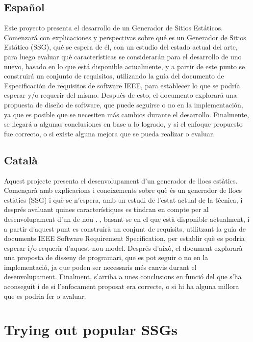 \documentclass[12pt]{report}
\begin{document}
    \section*{Español}
    Este proyecto presenta el desarrollo de un Generador de Sitios Estáticos. Comenzará con explicaciones y
    perspectivas sobre qué es un Generador de Sitios Estático (SSG), qué se espera de él, con un estudio del estado
    actual del arte, para luego evaluar qué características se considerarán para el desarrollo de uno nuevo, basado
    en lo que está disponible actualmente, y a partir de este punto se construirá un conjunto de requisitos,
    utilizando la guía del documento de Especificación de requisitos de software IEEE, para establecer lo que se podría
    esperar y/o requerir del mismo. Después de esto, el documento explorará una propuesta de diseño de software, que
    puede seguirse o no en la implementación, ya que es posible que se necesiten más cambios durante el desarrollo.
    Finalmente, se llegará a algunas conclusiones en base a lo logrado, y si el enfoque propuesto fue correcto, o si
    existe alguna mejora que se pueda realizar o evaluar.

    \section*{Català}
    Aquest projecte presenta el desenvolupament d'un generador de llocs estàtics. Començarà amb explicacions i
    coneixements sobre què és un generador de llocs estàtics (SSG) i què se n'espera, amb un estudi de l'estat actual
    de la tècnica, i després avaluant quines característiques es tindran en compte per al desenvolupament d'un de nou
    . , basant-se en el que està disponible actualment, i a partir d'aquest punt es construirà un conjunt de
    requisits, utilitzant la guia de documents IEEE Software Requirement Specification, per establir què es podria
    esperar i/o requerir d'aquest nou model. Després d'això, el document explorarà una proposta de disseny de
    programari, que es pot seguir o no en la implementació, ja que poden ser necessaris més canvis durant el
    desenvolupament. Finalment, s'arriba a unes conclusions en funció del que s'ha aconseguit i de si l'enfocament
    proposat era correcte, o si hi ha alguna millora que es podria fer o avaluar.

    \tableofcontents

    


    \chapter{Trying out popular SSGs}\label{ch:trying-out-popular-ssgs}
\end{document}
